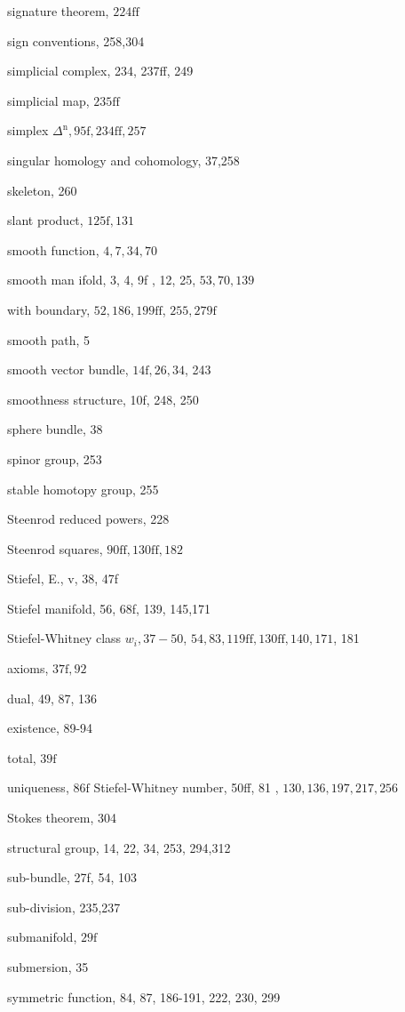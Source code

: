 \documentclass[10pt]{article}
\begin{document}
signature theorem, $224 \mathrm{ff}$

sign conventions, 258,304

simplicial complex, 234, 237ff, 249

simplicial map, $235 \mathrm{ff}$

simplex $\Delta^{\mathrm{n}}, 95 \mathrm{f}, 234 \mathrm{ff}, 257$

singular homology and cohomology, 37,258

skeleton, 260

slant product, $125 \mathrm{f}, 131$

smooth function, $4,7,34,70$

smooth man ifold, 3, 4, 9f , 12, 25, $53,70,139$

with boundary, $52,186,199 \mathrm{ff}$, $255,279 \mathrm{f}$

smooth path, 5

smooth vector bundle, $14 \mathrm{f}, 26,34$, 243

smoothness structure, 10f, 248, 250

sphere bundle, 38

spinor group, 253

stable homotopy group, 255

Steenrod reduced powers, 228

Steenrod squares, $90 \mathrm{ff}, 130 \mathrm{ff}, 182$

Stiefel, E., v, 38, 47f

Stiefel manifold, 56, 68f, 139, 145,171

Stiefel-Whitney class $w_{i}, 37-50$, $54,83,119 \mathrm{ff}, 130 \mathrm{ff}, 140,171$, 181

axioms, $37 \mathrm{f}, 92$

dual, 49, 87, 136

existence, 89-94

total, $39 \mathrm{f}$

uniqueness, $86 \mathrm{f}$ Stiefel-Whitney number, 50ff, 81 , $130,136,197,217,256$

Stokes theorem, 304

structural group, 14, 22, 34, 253, 294,312

sub-bundle, 27f, 54, 103

sub-division, 235,237

submanifold, $29 \mathrm{f}$

submersion, 35

symmetric function, 84, 87, 186-191, 222, 230, 299
\end{document}

